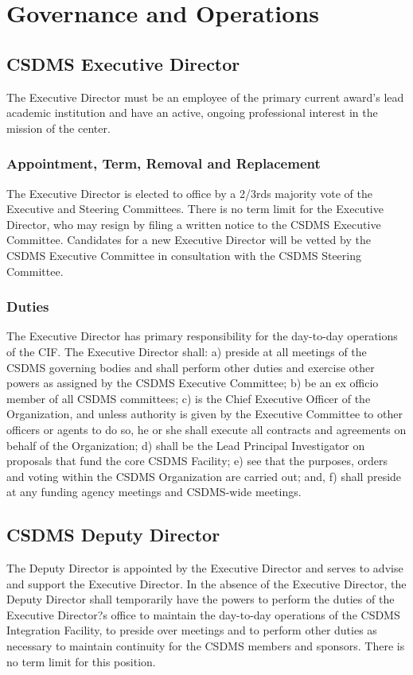 \documentclass[11pt, oneside]{article}   	%
\def\article#1{
\renewcommand{\thesection}{Article \Roman{section}} 
\section[Article]{#1}
\renewcommand{\thesection}{\Roman{section}} 
}
\begin{document}
\article{Governance and Operations}

\subsection{CSDMS Executive Director}

The Executive Director must be an employee of the primary current award's lead academic institution and have an active, ongoing professional interest in the mission of the center. 

\subsubsection{Appointment, Term, Removal and Replacement}

The Executive Director is elected to office by a 2/3rds majority vote of the Executive and Steering Committees.  There is no term limit for the Executive Director, who may resign by filing a written notice to the CSDMS Executive Committee.  Candidates for a new Executive Director will be vetted by the CSDMS Executive Committee in consultation with the CSDMS Steering Committee.  

\subsubsection{Duties}

The Executive Director has primary responsibility for the day-to-day operations of the CIF.  The Executive Director shall: a) preside at all meetings of the CSDMS governing bodies and shall perform other duties and exercise other powers as assigned by the CSDMS Executive Committee; b) be an ex officio member of all CSDMS committees; c) is the Chief Executive Officer of the Organization, and unless authority is given by the Executive Committee to other officers or agents to do so, he or she shall execute all contracts and agreements on behalf of the Organization; d) shall be the Lead Principal Investigator on proposals that fund the core CSDMS Facility; e) see that the purposes, orders and voting within the CSDMS Organization are carried out; and, f) shall preside at any funding agency meetings and CSDMS-wide meetings.
  
\subsection{CSDMS Deputy Director}

The Deputy Director is appointed by the Executive Director and serves to advise and support the Executive Director.  In the absence of the Executive Director, the Deputy Director shall temporarily have the powers to perform the duties of the Executive Director?s office to maintain the day-to-day operations of the CSDMS Integration Facility, to preside over meetings and to perform other duties as necessary to maintain continuity for the CSDMS members and sponsors.  There is no term limit for this position.
\end{document}
